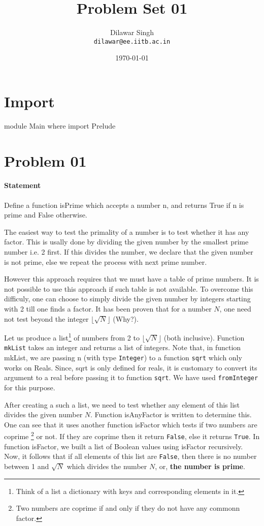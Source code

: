 \documentclass{article}%
\title{Problem Set 01}
\author{Dilawar Singh \\ 
\texttt{dilawar@ee.iitb.ac.in}}
\date{\today}
\begin{document}
 \maketitle

\section{Import}
\endmoddef\nwstartdeflinemarkup\nwenddeflinemarkup
module Main where
import Prelude

\nwendcode{}\nwdocspar
\section{Problem 01}
\paragraph{Statement}
Define a function isPrime which accepts a number n, and  returns  True
if n is prime and False otherwise.

The easiest way to test the primality of a number is to  test  whether
it has any  factor.   This  is  usally  done  by  dividing  the  given
number by the smallest prime number i.e. 2 first.  If this divides the
number, we declare that the given number is not prime, else we  repeat
the process with next prime number. 


However this approach requires that we must  have  a  table  of  prime
numbers. It is not possible to use this approach if such table is not
available. To overcome this difficuly, one can choose to simply divide
the given number by integers starting with 2 till one finds a factor.
It has been proven that for a number $N$, one need not test beyond the
integer $\lfloor \sqrt{N} \rfloor$ (Why?). 


Let us produce a list\footnote{Think of a list a dictionary with keys
and corresponding elements in it.} of numbers from 2 to $\lfloor
\sqrt{N} \rfloor$ (both inclusive). Function \texttt{mkList} takes an
integer and returns a list of integers. Note that, in function
{\Tt{}mkList\nwendquote}, we are passing n (with type \texttt{Integer}) to a
function \texttt{sqrt} which only works on Reals. Since, {\Tt{}sqrt\nwendquote} is
only defined for reals, it is customary to convert its argument to a
real before passing it to function \texttt{sqrt}. We have used
\texttt{fromInteger} for this purpose.


After creating a such a list, we need to test whether any element of
this list divides the given number $N$. Function {\Tt{}isAnyFactor\nwendquote} is
written to determine this. One can see that it uses another function
{\Tt{}isFactor\nwendquote} which tests if two numbers are coprime \footnote{Two
numbers are coprime if and only if they do not have any commonn
factor.} or not. If they are coprime then it return \texttt{False},
else it returns \texttt{True}. In function {\Tt{}isFactor\nwendquote}, we built a
    list of Boolean values using {\Tt{}isFactor\nwendquote} recursively. Now, it
    follows that if all elements of this list are \texttt{False}, then
    there is no number between 1 and $\sqrt{N}$ which divides the
    number $N$, or, \textbf{the number is prime}.
\end{document}
